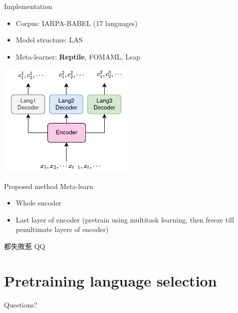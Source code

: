 \documentclass{beamer}
\begin{document}
\begin{frame}[t]{Implementation}
  \begin{itemize}
    \item Corpus: IARPA-BABEL (17 languages)
    \item Model structure: LAS
    \item Meta-learner: \textbf{Reptile}, FOMAML, Leap
  \end{itemize}
  \center \includegraphics[width=0.5\textwidth]{fig/MultiTaskASR.png}
\end{frame}

\begin{frame}{Proposed method}
  Meta-learn
  \begin{itemize}
    \item Whole encoder
    \item Last layer of encoder (pretrain using multitask learning, then freeze till penultimate layers of encoder)
  \end{itemize}
  \pause
  \center 都失敗惹 QQ
\end{frame}

\section{Pretraining language selection}




\begin{frame}
	\begin{center}
    \LARGE{Questions?}
	\end{center}
\end{frame}
\end{document}
